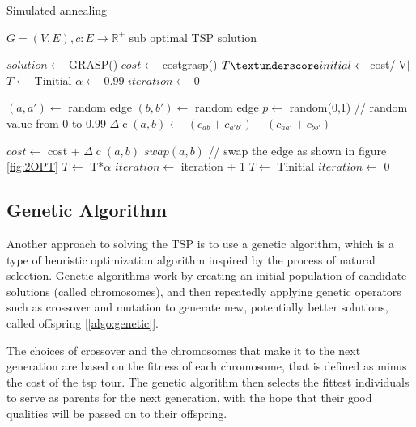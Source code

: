 	
\begin{algorithm}[h!]
    \caption{Simulated annealing}\label{algo:SimulatedAnnealing}
    \begin{algorithmic}[1]
    \Require $G = (V,E), c:E \to \mathbb{R}^+$
    \Ensure $\text{sub optimal TSP solution}$


    \State $solution \gets$ GRASP()
    \State $cost \gets$ cost\textunderscore grasp()
    \State $T \textunderscore initial \gets  $ cost/$|$V$|$ 
    \State $T \gets  $ T\textunderscore initial
    \State $ \alpha \gets $ 0.99
    \State $ iteration \gets $ 0
   




    \State $(a,a') \gets $ random edge
    \State $(b,b') \gets $ random edge 
    \State $p \gets $ random(0,1) // random value from 0 to 0.99
    \State $\Delta \operatorname{c}(a,b) \gets$  $(c_{ab} + c_{a'b'}) - (c_{aa'} + c_{bb'})$
    
    \State $cost \gets$ cost + $\Delta \operatorname{c}(a,b) $
    \State $swap(a,b)$ // swap the edge as shown in figure \ref{fig:2OPT}
    \EndIf
    \State $T \gets $ T*$\alpha$
    \State $iteration \gets $ iteration + 1
    \State $T \gets  $ T\textunderscore initial
    \State $iteration \gets  $ 0
    \EndIf
    

    \EndWhile

    \end{algorithmic}
\end{algorithm}

\subsection{Genetic Algorithm}
Another approach to solving the TSP is to use a genetic algorithm, which is a type of heuristic optimization algorithm inspired by the process of natural selection. Genetic algorithms work by creating an initial population of candidate solutions (called chromosomes), and then repeatedly applying genetic operators such as crossover and mutation to generate new, potentially better solutions, called offspring [\ref{algo:genetic}].


The choices of crossover and the chromosomes that make it to the next generation are based on the fitness of each chromosome, that is defined as minus the cost of the tsp tour. The genetic algorithm then selects the fittest individuals to serve as parents for the next generation, with the hope that their good qualities will be passed on to their offspring.

